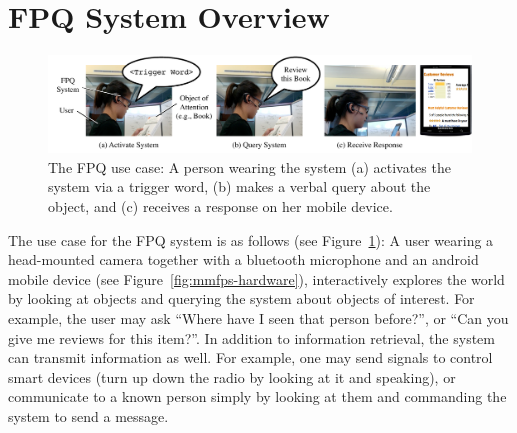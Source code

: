 \documentclass{llncs}
\begin{document}
%
\section{FPQ System Overview}
\begin{figure}[t]
\includegraphics[width=\linewidth]{fig/FPQ.pdf}
\caption{The FPQ use case: A person wearing the system (a) activates the system via a trigger word, (b) makes a verbal query about the object, and (c) receives a response on her mobile device.}
\label{fig:mmfps-usecase}
\end{figure}
The use case for the FPQ system is as follows (see Figure~\ref{fig:mmfps-usecase}): A user wearing a head-mounted camera together with a bluetooth microphone and an android mobile device (see Figure~\ref{fig:mmfps-hardware}), interactively explores the world by looking at objects and querying the system about objects of interest. For
example, the user may ask ``Where have I seen that person before?'', or ``Can you give me reviews for this item?''. In addition to information retrieval, the system can transmit information as well. For example, one may send signals to control smart devices (turn up down the radio by looking at it and speaking), or communicate to a known person
simply by looking at them and commanding the system to send a message.
\end{document}
